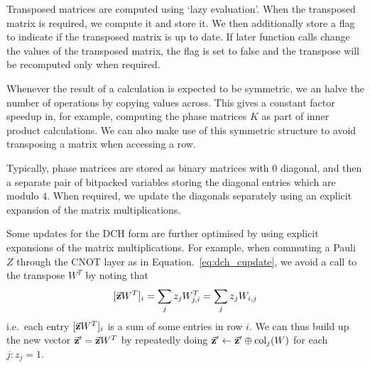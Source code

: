 Transposed matrices are computed using `lazy evaluation'. When the transposed matrix is required, we compute it and store it. We then additionally store a flag to indicate if the transposed matrix is up to date. If later function calls change the values of the transposed matrix, the flag is set to false and the transpose will be recomputed only when required.\par
Whenever the result of a calculation is expected to be symmetric, we an halve the number of operations by copying values across. This gives a constant factor speedup in, for example, computing the phase matrices $K$ as part of inner product calculations. We can also make use of this symmetric structure to avoid transposing a matrix when accessing a row.\par
Typically, phase matrices are stored as binary matrices with $0$ diagonal, and then a separate pair of bitpacked variables storing the diagonal entries which are modulo $4$. When required, we update the diagonals separately using an explicit expansion of the matrix multiplications.\par
Some updates for the DCH form are further optimised by using explicit expansions of the matrix multiplications. For example, when commuting a Pauli $Z$ through the CNOT layer as in Equation.~\ref{eq:dch_cupdate}, we avoid a call to the transpose $W^{T}$ by noting that
\[[\va{z}W^{T}]_{i} = \sum_{j}z_{j}W^{T}_{j,i}=\sum_{j}z_{j}W_{i,j} \]
i.e.\ each entry $[\va{z}W^{T}]_{i}$ is a sum of some entries in row $i$. We can thus build up the new vector $\va{z}'=\va{z}W^{T}$ by repeatedly doing $\va{z}'\gets \va{z}' \oplus \text{col}_{j}(W)$ for each $j:z_{j}=1$.
